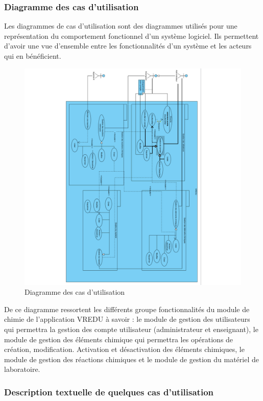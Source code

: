 \subsubsection{Diagramme des cas d’utilisation}

Les diagrammes de cas d'utilisation sont des diagrammes utilisés pour une représentation du comportement fonctionnel d'un système logiciel. Ils permettent d’avoir une vue d’ensemble entre les fonctionnalités d’un système et les acteurs qui en bénéficient.

\begin{figure}[H]
	\centering
	\includegraphics[trim={10cm 0 0 0}, width=1\textwidth]{img/ucd}
	\caption{Diagramme des cas d’utilisation}
	\label{fig:mesh1}
\end{figure}

De ce diagramme ressortent les différents groupe fonctionnalités du module de chimie de l’application VREDU à savoir :  le module de gestion des utilisateurs qui permettra la gestion des compte utilisateur (administrateur et enseignant), le module de gestion des éléments chimique qui permettra les opérations de création, modification. Activation et désactivation des éléments chimiques, le module de gestion des réactions chimiques et le module de gestion du matériel de laboratoire.

\subsubsection{Description textuelle de quelques cas d’utilisation}

